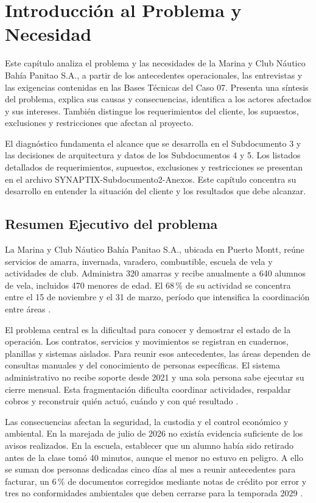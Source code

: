 \setcounter{chapter}{1}
\chapter{Introducción al Problema y Necesidad}
Este capítulo analiza el problema y las necesidades de la Marina y Club Náutico Bahía Panitao S.A., a partir de los antecedentes operacionales, las entrevistas y las exigencias contenidas en las Bases Técnicas del Caso 07. Presenta una síntesis del problema, explica sus causas y consecuencias, identifica a los actores afectados y sus intereses. También distingue los requerimientos del cliente, los supuestos, exclusiones y restricciones que afectan al proyecto.

El diagnóstico fundamenta el alcance que se desarrolla en el Subdocumento 3 y las decisiones de arquitectura y datos de los Subdocumentos 4 y 5. Los listados detallados de requerimientos, supuestos, exclusiones y restricciones se presentan en el archivo SYNAPTIX-Subdocumento2-Anexos. Este capítulo concentra su desarrollo en entender la situación del cliente y los resultados que debe alcanzar.

\newpage
\section{Resumen Ejecutivo del problema} %
La Marina y Club Náutico Bahía Panitao S.A., ubicada en Puerto Montt, reúne servicios de amarra, invernada, varadero, combustible, escuela de vela y actividades de club. Administra 320 amarras y recibe anualmente a 640 alumnos de vela, incluidos 470 menores de edad. El 68\,\% de su actividad se concentra entre el 15 de noviembre y el 31 de marzo, período que intensifica la coordinación entre áreas \parencite[cap.~2, seccs.~2.1-2.2, pp.~5-6]{pucv-caso07-2026}.

El problema central es la dificultad para conocer y demostrar el estado de la operación. Los contratos, servicios y movimientos se registran en cuadernos, planillas y sistemas aislados. Para reunir esos antecedentes, las áreas dependen de consultas manuales y del conocimiento de personas específicas. El sistema administrativo no recibe soporte desde 2021 y una sola persona sabe ejecutar su cierre mensual. Esta fragmentación dificulta coordinar actividades, respaldar cobros y reconstruir quién actuó, cuándo y con qué resultado \parencite[caps.~4-5, pp.~9-14]{pucv-caso07-2026}.

Las consecuencias afectan la seguridad, la custodia y el control económico y ambiental. En la marejada de julio de 2026 no existía evidencia suficiente de los avisos realizados. En la escuela, establecer que un alumno había sido retirado antes de la clase tomó 40 minutos, aunque el menor no estuvo en peligro. A ello se suman dos personas dedicadas cinco días al mes a reunir antecedentes para facturar, un 6\,\% de documentos corregidos mediante notas de crédito por error y tres no conformidades ambientales que deben cerrarse para la temporada 2029 \parencite[cap.~1, pp.~4-5; cap.~4, secc.~4.11, p.~13; cap.~18, criterio~19, p.~44]{pucv-caso07-2026}.

